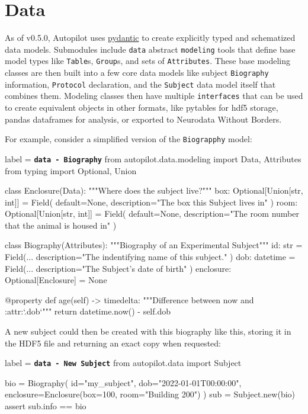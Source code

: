 \section{Data}
\label{sec:datamodel}

As of v0.5.0, Autopilot uses \href{https://pydantic-docs.helpmanual.io/}{pydantic} to create explicitly typed and schematized data models. Submodules include \texttt{data} abstract \texttt{modeling} tools that define base model types like \texttt{Table}s, \texttt{Group}s, and sets of \texttt{Attributes}. These base modeling classes are then built into a few core data models like subject \texttt{Biography} information, \texttt{Protocol} declaration, and the \texttt{Subject} data model itself that combines them. Modeling classes then have multiple \texttt{interfaces} that can be used to create equivalent objects in other formats, like pytables for hdf5 storage, pandas dataframes for analysis, or exported to Neurodata Without Borders.

For example, consider a simplified version of the \texttt{Biograpphy} model:


\begin{pythoncode*}{label = \texttt{\textbf{data - Biography}}}
from autopilot.data.modeling import Data, Attributes
from typing import Optional, Union

class Enclosure(Data):
    """Where does the subject live?"""
    box:  Optional[Union[str, int]] = Field(
        default=None, 
        description="The box this Subject lives in"
    )
    room: Optional[Union[str, int]] = Field(
        default=None, 
        description="The room number that the animal is housed in"
    )

class Biography(Attributes):
    """Biography of an Experimental Subject"""
    id:  str = Field(...
        description="The indentifying name of this subject."
    )
    dob: datetime = Field(... 
        description="The Subject's date of birth"
    )
    enclosure: Optional[Enclosure] = None

    @property
    def age(self) -> timedelta:
        """Difference between now and :attr:`.dob`"""
        return datetime.now() - self.dob
\end{pythoncode*}

A new subject could then be created with this biography like this, storing it in the HDF5 file and returning an exact copy when requested:

\begin{pythoncode*}{label = \texttt{\textbf{data - New Subject}}}
from autopilot.data import Subject

bio = Biography(
    id="my_subject",
    dob="2022-01-01T00:00:00",
    enclosure=Enclosure(box=100, room="Building 200")
)
sub = Subject.new(bio)
assert sub.info == bio
\end{pythoncode*}

